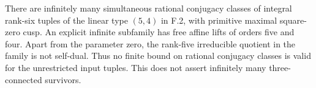 \begin{theorem}\label{maps:src:F.2.16}


There are infinitely many simultaneous rational conjugacy classes
of integral rank-six tuples of the linear type $(5,4)$ in F.2,
with primitive maximal square-zero cusp.  An explicit infinite
subfamily has free affine lifts of orders five and four.
Apart from the parameter zero, the rank-five irreducible quotient
in the family is not self-dual.  Thus no finite bound on rational
conjugacy classes is valid for the unrestricted input tuples.
This does not assert infinitely many three-connected survivors.

\end{theorem}


